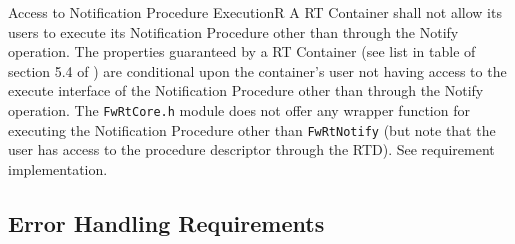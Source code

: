\documentclass[requirements]{../fwprofile}
\begin{document}
\begin{fw_req}{Access to Notification Procedure Execution}{R}
{A RT Container shall not allow its users to execute its Notification Procedure other than through the Notify operation.}
{The properties guaranteed by a RT Container (see list in table of section 5.4 of \cite{ref:fwprofile}) are conditional upon the container's user not having access to the execute interface of the Notification Procedure other than through the Notify operation. }
{The \texttt{FwRtCore.h} module does not offer any wrapper function for executing the Notification Procedure other than \texttt{FwRtNotify} (but note that the user has access to the procedure descriptor through the RTD).} 
{See requirement implementation.}
\end{fw_req}

\subsection{Error Handling Requirements}\label{req:errorCodeRT}
\end{document}

